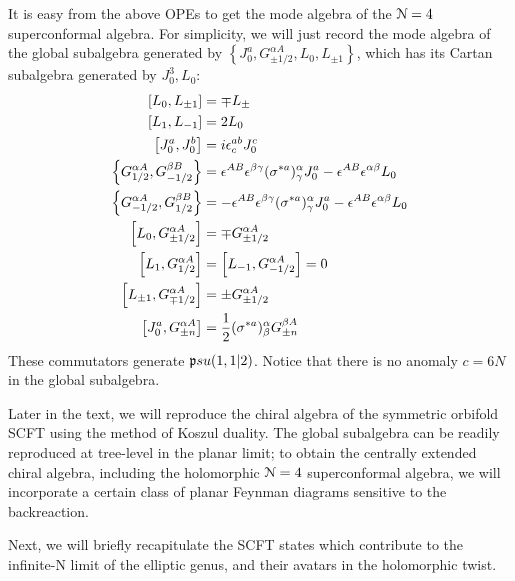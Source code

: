 \documentclass[../main.tex]{subfiles}
\begin{document}
 It is easy from the above OPEs to get the mode algebra of the $\mathcal N=4$ superconformal algebra. For simplicity, we will just record the mode algebra of the global subalgebra generated by $\left\lbrace J_0^a, G^{\alpha A}_{\pm 1/2}, L_0, L_{\pm 1} \right\rbrace$, which has its Cartan subalgebra generated by $J_0^3, L_0$: 
 \begin{align}
 \left[L_0, L_{\pm 1} \right]&= \mp L_{\pm}\\
 \left[L_1, L_{-1}\right] &= 2 L_0 \\
 \left[J^a_0, J^b_0 \right]&= i \epsilon^{a b}_c J^c_0 \\
 \left\lbrace  G^{\alpha A}_{1/2}, G^{\beta B}_{-1/2}\right\rbrace &= \epsilon^{AB}\epsilon^{\beta\gamma}(\sigma^{*a})^{\alpha}_{\gamma}J^a_0 -\epsilon^{AB}\epsilon^{\alpha \beta}L_0 \\
 \left\lbrace  G^{\alpha A}_{-1/2}, G^{\beta B}_{1/2}\right\rbrace &= -\epsilon^{AB}\epsilon^{\beta\gamma}(\sigma^{*a})^{\alpha}_{\gamma}J^a_0 -\epsilon^{AB}\epsilon^{\alpha \beta}L_0 \\
 \left[L_0, G^{\alpha A}_{\pm 1/2} \right]&= \mp G^{\alpha A}_{\pm 1/2}\\
 \left[L_1, G^{\alpha A}_{1/2}\right]&= \left[L_{-1}, G^{\alpha A}_{-1/2} \right] = 0 \\
 \left[L_{\pm1}, G^{\alpha A}_{\mp 1/2} \right]&= \pm G^{\alpha A}_{\pm 1/2} \\
 \left[J^a_{0}, G^{\alpha A}_{\pm n} \right]&= {1 \over 2}(\sigma^{*a})^{\alpha}_{\beta}G^{\beta A}_{\pm n} 
 \end{align} These commutators generate $\mathfrak psu(1,1|2)$. Notice that there is no anomaly $c = 6 N$ in the global subalgebra. 
 
 Later in the text, we will reproduce the chiral algebra of the symmetric orbifold SCFT using the method of Koszul duality. The global subalgebra can be readily reproduced at tree-level in the planar limit; to obtain the centrally extended chiral algebra, including the holomorphic $\mathcal{N}=4$ superconformal algebra, we will incorporate a certain class of planar Feynman diagrams sensitive to the backreaction. 
 
Next, we will briefly recapitulate the SCFT states which contribute to the infinite-N limit of the elliptic genus, and their avatars in the holomorphic twist. 
 
\end{document}
